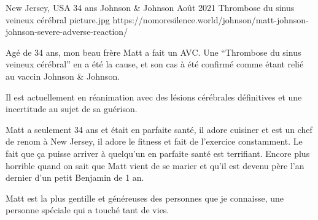           {New Jersey, USA}
          {34 ans}
          {Johnson \& Johnson}
          {Août 2021}
          {Thrombose du sinus veineux cérébral}
          {picture.jpg}
          {https://nomoresilence.world/johnson/matt-johnson-johnson-severe-adverse-reaction/}
          {

Agé de 34 ans, mon beau frère Matt a fait un AVC. Une “Thrombose du sinus
veineux cérébral” en a été la cause, et son cas à été confirmé comme étant relié
au vaccin Johnson \& Johnson.

Il est actuellement en réanimation avec des lésions cérébrales définitives et
une incertitude au sujet de sa guérison.

Matt a seulement 34 ans et était en parfaite santé, il adore cuisiner et est un
chef de renom à New Jersey, il adore le fitness et fait de l'exercice
constamment. Le fait que ça puisse arriver à quelqu'un en parfaite santé est
terrifiant. Encore plus horrible quand on sait que Matt vient de se marier et
qu'il est devenu père l'an dernier d'un petit Benjamin de 1 an.

Matt est la plus gentille et généreuses des personnes que je connaisse, une
personne spéciale qui a touché tant de vies.

}

